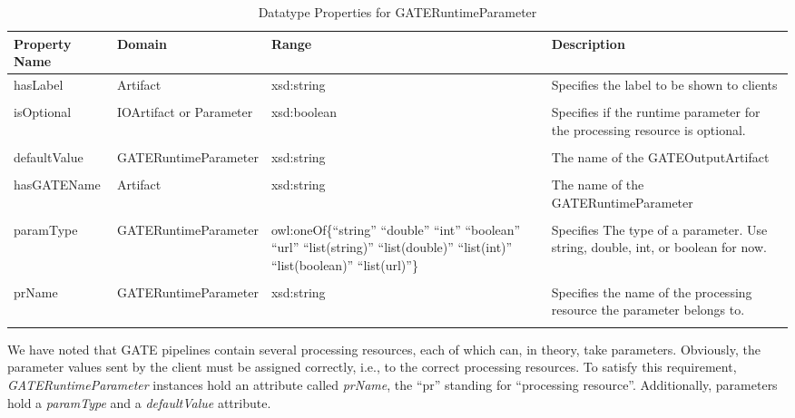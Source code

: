 \begin{table}[tb]
\centering\small\sffamily
\begin{tabular}{p{}@{\hspace*{4mm}}p{}@{\hspace*{2mm}}p{}@{\hspace*{2mm}}p{}}
  \toprule 
  \textbf{Property Name}&\textbf{Domain} &\textbf{Range} &\textbf{Description} \\
  \midrule
 
  hasLabel & Artifact & xsd:string & Specifies the label to be shown to clients
  \\

   & & \\


  isOptional & IOArtifact or Parameter & xsd:boolean & Specifies if the runtime parameter for the processing resource is optional.
  \\

   & & \\ 
  
  defaultValue & GATERuntimeParameter & xsd:string & The name of the GATEOutputArtifact
  \\

   & & \\  

  hasGATEName & Artifact & xsd:string & The name of the GATERuntimeParameter
  \\

   & & \\ 

  paramType & GATERuntimeParameter & owl:oneOf\{``string'' ``double'' ``int'' ``boolean'' ``url'' ``list(string)'' ``list(double)'' ``list(int)'' ``list(boolean)'' ``list(url)''\} & Specifies The type of a parameter. Use string, double, int, or boolean for now.
  \\

   & & \\ 

  prName & GATERuntimeParameter & xsd:string & Specifies the name of the processing resource the parameter belongs to.
  \\

   & & \\ 
  \bottomrule
\end{tabular}
\caption{Datatype Properties for GATERuntimeParameter}
\label{tab:run-dat-prop}
\end{table}


We have noted that GATE pipelines contain several processing
resources, each of which can, in theory, take parameters. Obviously,
the parameter values sent by the client must be assigned correctly,
i.e., to the correct processing resources. To satisfy this
requirement, \emph{GATERuntimeParameter} instances hold an attribute
called \emph{prName}, the ``pr'' standing for ``processing
resource''. Additionally, parameters hold a \emph{paramType} and a
\emph{defaultValue} attribute.


